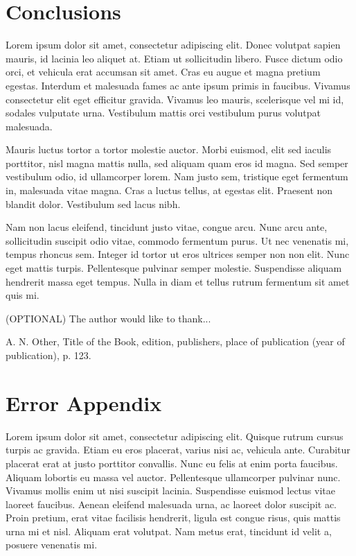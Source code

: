 \documentclass[10pt,twocolumn]{revtex4-2}    %
\begin{document}
\section{Conclusions}
 
Lorem ipsum dolor sit amet, consectetur adipiscing elit. Donec volutpat sapien mauris, id lacinia leo aliquet at. Etiam ut sollicitudin libero. Fusce dictum odio orci, et vehicula erat accumsan sit amet. Cras eu augue et magna pretium egestas. Interdum et malesuada fames ac ante ipsum primis in faucibus. Vivamus consectetur elit eget efficitur gravida. Vivamus leo mauris, scelerisque vel mi id, sodales vulputate urna. Vestibulum mattis orci vestibulum purus volutpat malesuada.

Mauris luctus tortor a tortor molestie auctor. Morbi euismod, elit sed iaculis porttitor, nisl magna mattis nulla, sed aliquam quam eros id magna. Sed semper vestibulum odio, id ullamcorper lorem. Nam justo sem, tristique eget fermentum in, malesuada vitae magna. Cras a luctus tellus, at egestas elit. Praesent non blandit dolor. Vestibulum sed lacus nibh.

Nam non lacus eleifend, tincidunt justo vitae, congue arcu. Nunc arcu ante, sollicitudin suscipit odio vitae, commodo fermentum purus. Ut nec venenatis mi, tempus rhoncus sem. Integer id tortor ut eros ultrices semper non non elit. Nunc eget mattis turpis. Pellentesque pulvinar semper molestie. Suspendisse aliquam hendrerit massa eget tempus. Nulla in diam et tellus rutrum fermentum sit amet quis mi.


\begin{acknowledgments}
(OPTIONAL) The author would like to thank...
\end{acknowledgments}

\begin{thebibliography}{}

 A. N. Other, Title of the Book, edition, publishers, place of publication (year of publication), p. 123.   %


\end{thebibliography} 

\newpage

\section*{Error Appendix}
Lorem ipsum dolor sit amet, consectetur adipiscing elit. Quisque rutrum cursus turpis ac gravida. Etiam eu eros placerat, varius nisi ac, vehicula ante. Curabitur placerat erat at justo porttitor convallis. Nunc eu felis at enim porta faucibus. Aliquam lobortis eu massa vel auctor. Pellentesque ullamcorper pulvinar nunc. Vivamus mollis enim ut nisi suscipit lacinia. Suspendisse euismod lectus vitae laoreet faucibus. Aenean eleifend malesuada urna, ac laoreet dolor suscipit ac. Proin pretium, erat vitae facilisis hendrerit, ligula est congue risus, quis mattis urna mi et nisl. Aliquam erat volutpat. Nam metus erat, tincidunt id velit a, posuere venenatis mi.
\end{document}

